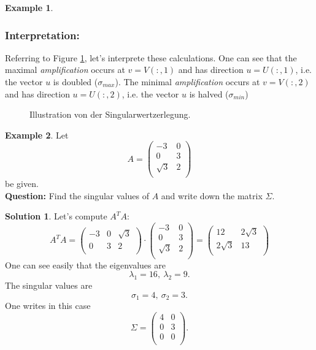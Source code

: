 \documentclass[a4paper,12 pt]{article}
\numberwithin{equation}{section}
\theoremstyle{definition}
\newtheorem{bsp}{Example}
\theoremstyle{remark}
\theoremstyle{definition}
\newtheorem*{lsg}{Solution}
\theoremstyle{definition}
\theoremstyle{definition}
\theoremstyle{remark}
\begin{document}
\begin{bsp}
\subsubsection*{Interpretation:}
Referring to Figure \ref{fig:svdex}, let's interprete these calculations. One can see that the maximal \textit{amplification} occurs at $v=V(:,1)$ and has direction $u=U(:,1)$, i.e. the vector $u$ is doubled ($\sigma_{max}$). The minimal \textit{amplification} occurs at $v=V(:,2)$ and has direction $u=U(:,2)$, i.e. the vector $u$ is halved ($\sigma_{min}$)

\begin{figure}[ht]
\begin{center}
\end{center}
\caption{Illustration von der Singularwertzerlegung.}
\label{fig:svdex}
\end{figure}
\end{bsp}

\pagebreak

\begin{bsp}
Let
$$A=\begin{pmatrix}
-3&0\\
0&3\\
\sqrt{3}&2\\
\end{pmatrix}$$
be given.\\
\textbf{Question:} Find the singular values of $A$ and write down the matrix $\Sigma$.
\begin{lsg}
Let's compute $A^TA$:
$$A^TA=\begin{pmatrix}
-3&0&\sqrt{3}\\
0&3&2\\
\end{pmatrix}\cdot \begin{pmatrix}
-3&0\\
0&3\\
\sqrt{3}&2\\
\end{pmatrix}=\begin{pmatrix}
12&2\sqrt{3}\\
2\sqrt{3}&13\\
\end{pmatrix}$$
One can see easily that the eigenvalues are
$$\lambda_1=16,\ \lambda_2=9.$$
The singular values are
$$\sigma_1=4,\ \sigma_2=3.$$
One writes in this case$$\Sigma=\begin{pmatrix}
4&0\\
0&3\\
0&0\\
\end{pmatrix}.$$
\end{lsg}
\end{bsp}
\end{document}
